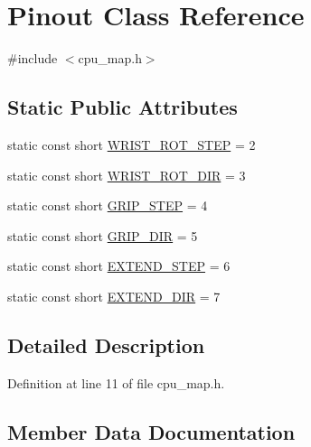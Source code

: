 \hypertarget{class_pinout}{}\section{Pinout Class Reference}
\label{class_pinout}


{\ttfamily \#include $<$cpu\+\_\+map.\+h$>$}

\subsection*{Static Public Attributes}
\begin{DoxyCompactItemize}
\item 
static const short \hyperlink{class_pinout_a5f15f2424dc98ebf66f74063798ae28e}{W\+R\+I\+S\+T\+\_\+\+R\+O\+T\+\_\+\+S\+T\+EP} = 2
\item 
static const short \hyperlink{class_pinout_a2bdfc2d0feb1763149886acaab1a0419}{W\+R\+I\+S\+T\+\_\+\+R\+O\+T\+\_\+\+D\+IR} = 3
\item 
static const short \hyperlink{class_pinout_a034e6fd901a557f17809260288ea4740}{G\+R\+I\+P\+\_\+\+S\+T\+EP} = 4
\item 
static const short \hyperlink{class_pinout_a49466f79a0074d31c74885c4876693de}{G\+R\+I\+P\+\_\+\+D\+IR} = 5
\item 
static const short \hyperlink{class_pinout_a69dd96e739859d5cc64e477ca844276b}{E\+X\+T\+E\+N\+D\+\_\+\+S\+T\+EP} = 6
\item 
static const short \hyperlink{class_pinout_a361ce1c43bf6c143f2ae3e85ba0d5e25}{E\+X\+T\+E\+N\+D\+\_\+\+D\+IR} = 7
\end{DoxyCompactItemize}


\subsection{Detailed Description}


Definition at line 11 of file cpu\+\_\+map.\+h.



\subsection{Member Data Documentation}
\mbox{\label{class_pinout_a361ce1c43bf6c143f2ae3e85ba0d5e25}} 
